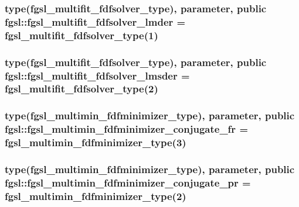 \hypertarget{classfgsl_a8d1aeaeb6d1cc87ec0d79eddf44965b8}{
\subsubsection[{fgsl\-\_\-multifit\-\_\-fdfsolver\-\_\-lmder}]{\setlength{\rightskip}{0pt plus 5cm}type({\bf fgsl\-\_\-multifit\-\_\-fdfsolver\-\_\-type}), parameter, public fgsl\-::fgsl\-\_\-multifit\-\_\-fdfsolver\-\_\-lmder = {\bf fgsl\-\_\-multifit\-\_\-fdfsolver\-\_\-type}(1)}}\label{classfgsl_a8d1aeaeb6d1cc87ec0d79eddf44965b8}
\hypertarget{classfgsl_a24b9409272a5a9556e295c38502b6dbc}{
\subsubsection[{fgsl\-\_\-multifit\-\_\-fdfsolver\-\_\-lmsder}]{\setlength{\rightskip}{0pt plus 5cm}type({\bf fgsl\-\_\-multifit\-\_\-fdfsolver\-\_\-type}), parameter, public fgsl\-::fgsl\-\_\-multifit\-\_\-fdfsolver\-\_\-lmsder = {\bf fgsl\-\_\-multifit\-\_\-fdfsolver\-\_\-type}(2)}}\label{classfgsl_a24b9409272a5a9556e295c38502b6dbc}
\hypertarget{classfgsl_a94fc756d777c9358f808374b01e6a879}{
\subsubsection[{fgsl\-\_\-multimin\-\_\-fdfminimizer\-\_\-conjugate\-\_\-fr}]{\setlength{\rightskip}{0pt plus 5cm}type({\bf fgsl\-\_\-multimin\-\_\-fdfminimizer\-\_\-type}), parameter, public fgsl\-::fgsl\-\_\-multimin\-\_\-fdfminimizer\-\_\-conjugate\-\_\-fr = {\bf fgsl\-\_\-multimin\-\_\-fdfminimizer\-\_\-type}(3)}}\label{classfgsl_a94fc756d777c9358f808374b01e6a879}
\hypertarget{classfgsl_a8ac392b0c99b65482d4a3f6a8f719ed6}{
\subsubsection[{fgsl\-\_\-multimin\-\_\-fdfminimizer\-\_\-conjugate\-\_\-pr}]{\setlength{\rightskip}{0pt plus 5cm}type({\bf fgsl\-\_\-multimin\-\_\-fdfminimizer\-\_\-type}), parameter, public fgsl\-::fgsl\-\_\-multimin\-\_\-fdfminimizer\-\_\-conjugate\-\_\-pr = {\bf fgsl\-\_\-multimin\-\_\-fdfminimizer\-\_\-type}(2)}}\label{classfgsl_a8ac392b0c99b65482d4a3f6a8f719ed6}
